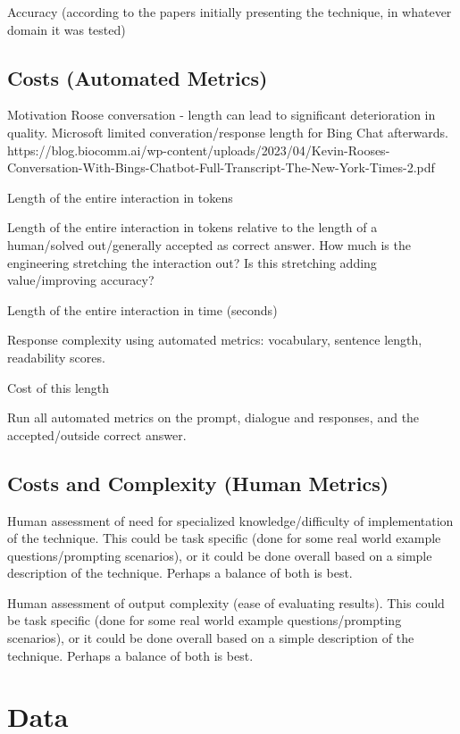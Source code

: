\documentclass[11pt]{article}
\begin{document}
Accuracy (according to the papers initially presenting the technique, in whatever domain it was tested)

\subsection{Costs (Automated Metrics)}

Motivation
Roose conversation - length can lead to significant deterioration in quality. Microsoft limited converation/response length for Bing Chat afterwards. \cite{roose_conversation_2023}
https://blog.biocomm.ai/wp-content/uploads/2023/04/Kevin-Rooses-Conversation-With-Bings-Chatbot-Full-Transcript-The-New-York-Times-2.pdf

Length of the entire interaction in tokens

Length of the entire interaction in tokens relative to the length of a human/solved out/generally accepted as correct answer. How much is the engineering stretching the interaction out? Is this stretching adding value/improving accuracy?

Length of the entire interaction in time (seconds)

Response complexity using automated metrics: vocabulary, sentence length, readability scores.

Cost of this length

Run all automated metrics on the prompt, dialogue and responses, and the accepted/outside correct answer.

\subsection{Costs and Complexity (Human Metrics)}

Human assessment of need for specialized knowledge/difficulty of implementation of the technique. This could be task specific (done for some real world example questions/prompting scenarios), or it could be done overall based on a simple description of the technique. Perhaps a balance of both is best.

Human assessment of output complexity (ease of evaluating results). This could be task specific (done for some real world example questions/prompting scenarios), or it could be done overall based on a simple description of the technique. Perhaps a balance of both is best.

\section{Data}
\end{document}
